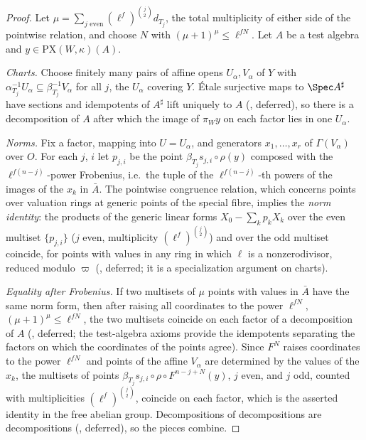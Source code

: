 \begin{proof}
Let $\mu=\sum_{j\text{ even}}(\ell^f)^{\binom j2}d_{T_j}$, the total multiplicity of either side of the pointwise relation, and choose
$N$ with $(\mu+1)^\mu\le\ell^{fN}$. Let $A$ be a test algebra and $y\in\mathrm{PX}(W,\kappa)(A)$.

\emph{Charts.} Choose finitely many pairs of affine opens $U_\alpha,V_\alpha$ of $Y$ with $\alpha_{T_j}^{-1}U_\alpha\subseteq
\beta_{T_j}^{-1}V_\alpha$ for all $j$, the $U_\alpha$ covering $Y$. \'Etale surjective maps to $\Spec A^\sharp$ have sections and
idempotents of $A^\sharp$ lift uniquely to $A$ (, deferred), so there is a
decomposition of $A$ after which the image of $\pi_Wy$ on each factor lies in one $U_\alpha$.

\emph{Norms.} Fix a factor, mapping into $U=U_\alpha$, and generators $x_1,\dots,x_r$ of $\Gamma(V_\alpha)$ over $O$. For each $j$, $i$ let
$p_{j,i}$ be the point $\beta_{T_j}s_{j,i}\circ\rho(y)$ composed with the $\ell^{f(n-j)}$-power Frobenius, i.e.\ the tuple of the
$\ell^{f(n-j)}$-th powers of the images of the $x_k$ in $\bar A$. The pointwise congruence relation, which concerns points over
valuation rings at generic points of the special fibre, implies the \emph{norm identity}: the products of the generic linear forms
$X_0-\sum_kp_k X_k$ over the even multiset $\{p_{j,i}\}$ ($j$ even, multiplicity $(\ell^f)^{\binom j2}$) and over the odd multiset
coincide, for points with values in any ring in which $\ell$ is a nonzerodivisor, reduced modulo $\varpi$
(, deferred; it is a specialization argument on charts).

\emph{Equality after Frobenius.} If two multisets of $\mu$ points with values in $\bar A$ have the same norm form, then after
raising all coordinates to the power $\ell^{fN}$, $(\mu+1)^\mu\le\ell^{fN}$, the two multisets coincide on each factor of a
decomposition of $A$ (, deferred; the test-algebra axioms provide the
idempotents separating the factors on which the coordinates of the points agree). Since $F^{N}$ raises coordinates to the power
$\ell^{fN}$ and points of the affine $V_\alpha$ are determined by the values of the $x_k$, the multisets of points
$\beta_{T_j}s_{j,i}\circ\rho\circ F^{n-j+N}(y)$, $j$ even, and $j$ odd, counted with multiplicities $(\ell^f)^{\binom j2}$, coincide on
each factor, which is the asserted identity in the free abelian group. Decompositions of decompositions are decompositions
(, deferred), so the pieces combine.
\end{proof}

